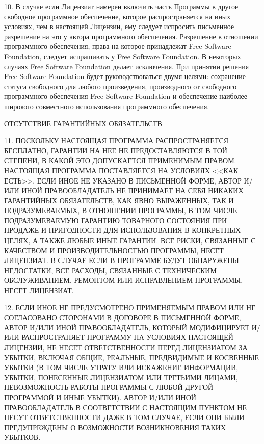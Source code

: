 \begin{small}
10. В случае если Лицензиат намерен включить часть Программы в другое
свободное программное обеспечение, которое распространяется на иных
условиях, чем в настоящей Лицензии, ему следует испросить письменное
разрешение на это у автора программного обеспечения. Разрешение в
отношении программного обеспечения, права на которое принадлежат Free
Software Foundation, следует испрашивать у Free Software Foundation. В
некоторых случаях Free Software Foundation делает исключения. При
принятии решения Free Software Foundation будет руководствоваться двумя
целями: сохранение статуса свободного для любого произведения,
производного от свободного программного обеспечения Free Software
Foundation и обеспечение наиболее широкого совместного использования
программного обеспечения.

ОТСУТСТВИЕ ГАРАНТИЙНЫХ ОБЯЗАТЕЛЬСТВ

11. ПОСКОЛЬКУ НАСТОЯЩАЯ ПРОГРАММА РАСПРОСТРАНЯЕТСЯ БЕСПЛАТНО, ГАРАНТИИ
НА НЕЕ НЕ ПРЕДОСТАВЛЯЮТСЯ В ТОЙ СТЕПЕНИ, В КАКОЙ ЭТО ДОПУСКАЕТСЯ
ПРИМЕНИМЫМ ПРАВОМ. НАСТОЯЩАЯ ПРОГРАММА ПОСТАВЛЯЕТСЯ НА УСЛОВИЯХ
<<КАК ЕСТЬ>>. ЕСЛИ ИНОЕ НЕ УКАЗАНО В ПИСЬМЕННОЙ ФОРМЕ, АВТОР И/ИЛИ ИНОЙ
ПРАВООБЛАДАТЕЛЬ НЕ ПРИНИМАЕТ НА СЕБЯ НИКАКИХ ГАРАНТИЙНЫХ ОБЯЗАТЕЛЬСТВ,
КАК ЯВНО ВЫРАЖЕННЫХ, ТАК И ПОДРАЗУМЕВАЕМЫХ, В ОТНОШЕНИИ ПРОГРАММЫ, В ТОМ
ЧИСЛЕ ПОДРАЗУМЕВАЕМУЮ ГАРАНТИЮ ТОВАРНОГО СОСТОЯНИЯ ПРИ ПРОДАЖЕ И
ПРИГОДНОСТИ ДЛЯ ИСПОЛЬЗОВАНИЯ В КОНКРЕТНЫХ ЦЕЛЯХ, А ТАКЖЕ ЛЮБЫЕ ИНЫЕ
ГАРАНТИИ. ВСЕ РИСКИ, СВЯЗАННЫЕ С КАЧЕСТВОМ И ПРОИЗВОДИТЕЛЬНОСТЬЮ
ПРОГРАММЫ, НЕСЕТ ЛИЦЕНЗИАТ. В СЛУЧАЕ ЕСЛИ В ПРОГРАММЕ БУДУТ ОБНАРУЖЕНЫ
НЕДОСТАТКИ, ВСЕ РАСХОДЫ, СВЯЗАННЫЕ С ТЕХНИЧЕСКИМ ОБСЛУЖИВАНИЕМ, РЕМОНТОМ
ИЛИ ИСПРАВЛЕНИЕМ ПРОГРАММЫ, НЕСЕТ ЛИЦЕНЗИАТ.

12. ЕСЛИ ИНОЕ НЕ ПРЕДУСМОТРЕНО ПРИМЕНЯЕМЫМ ПРАВОМ ИЛИ НЕ СОГЛАСОВАНО
СТОРОНАМИ В ДОГОВОРЕ В ПИСЬМЕННОЙ ФОРМЕ, АВТОР И/ИЛИ ИНОЙ ПРАВООБЛАДАТЕЛЬ,
КОТОРЫЙ МОДИФИЦИРУЕТ И/ИЛИ РАСПРОСТРАНЯЕТ ПРОГРАММУ НА УСЛОВИЯХ НАСТОЯЩЕЙ
ЛИЦЕНЗИИ, НЕ НЕСЕТ ОТВЕТСТВЕННОСТИ ПЕРЕД ЛИЦЕНЗИАТОМ ЗА УБЫТКИ, ВКЛЮЧАЯ
ОБЩИЕ, РЕАЛЬНЫЕ, ПРЕДВИДИМЫЕ И КОСВЕННЫЕ УБЫТКИ (В ТОМ ЧИСЛЕ УТРАТУ ИЛИ
ИСКАЖЕНИЕ ИНФОРМАЦИИ, УБЫТКИ, ПОНЕСЕННЫЕ ЛИЦЕНЗИАТОМ ИЛИ ТРЕТЬИМИ ЛИЦАМИ,
НЕВОЗМОЖНОСТЬ РАБОТЫ ПРОГРАММЫ С ЛЮБОЙ ДРУГОЙ ПРОГРАММОЙ И ИНЫЕ УБЫТКИ).
АВТОР И/ИЛИ ИНОЙ ПРАВООБЛАДАТЕЛЬ В СООТВЕТСТВИИ С НАСТОЯЩИМ ПУНКТОМ НЕ
НЕСУТ ОТВЕТСТВЕННОСТИ ДАЖЕ В ТОМ СЛУЧАЕ, ЕСЛИ ОНИ БЫЛИ ПРЕДУПРЕЖДЕНЫ О
ВОЗМОЖНОСТИ ВОЗНИКНОВЕНИЯ ТАКИХ УБЫТКОВ.
\end{small}
